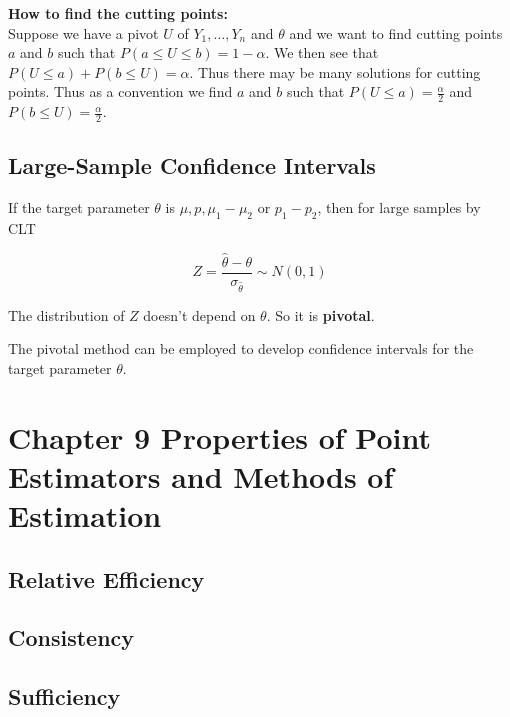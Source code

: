 \documentclass[a4paper,12pt]{article}
\theoremstyle{nonitalic}
\begin{document}
    \bigskip

    \textbf{How to find the cutting points:}\\
    Suppose we have a pivot $U$ of $Y_1, \ldots, Y_n$ and $\theta$ and we want to find cutting points $a$ and $b$ such that $P(a \leq U \leq b) = 1 - \alpha$. We then see that $P(U \leq a) + P(b \leq U) = \alpha$. Thus there may be many solutions for cutting points. Thus as a convention we find $a$ and $b$ such that $P(U \leq a) = \frac{\alpha}{2}$ and $P(b \leq U) = \frac{\alpha}{2}$.

    \newpage

    \subsection{Large-Sample Confidence Intervals}

    If the target parameter \(\theta\) is \(\mu, p, \mu_1 - \mu_2\) or \(p_1 - p_2\), then for large samples by CLT
        
    \[
        Z = \frac{\hat{\theta} - \theta}{\sigma_{\hat{\theta}}} \sim N(0, 1)
    \]
        
    The distribution of \(Z\) doesn’t depend on \(\theta\). So it is \textbf{pivotal}.
        
    The pivotal method can be employed to develop confidence intervals for the target parameter \(\theta\).

    \newpage

    \section{Chapter 9 \textemdash{} Properties of Point Estimators and Methods of Estimation}

    \subsection{Relative Efficiency}

    \newpage

    \subsection{Consistency}

    \newpage

    \subsection{Sufficiency}
\end{document}
